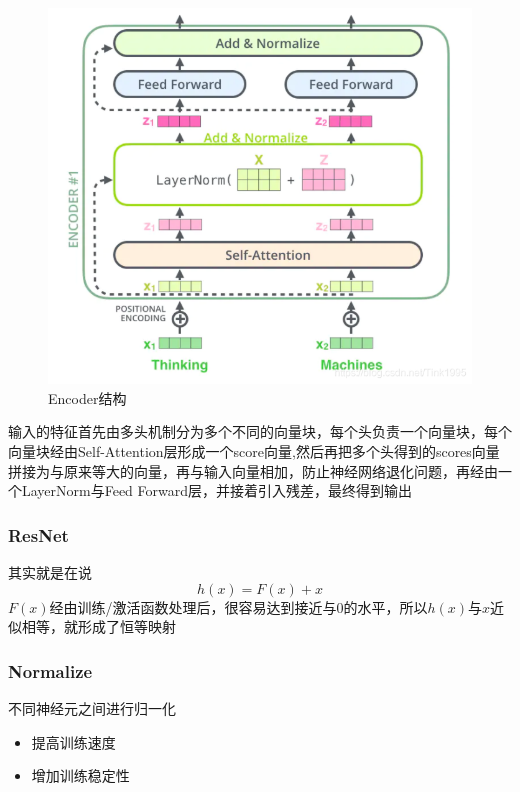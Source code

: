 \documentclass{article}
\begin{document}
\begin{sloppypar}
      \begin{figure}[ht]
            \centering
            \label{enc}
            \includegraphics[scale=0.5]{enc}
            \caption{Encoder结构}
      \end{figure}
      输入的特征首先由多头机制分为多个不同的向量块，每个头负责一个向量块，每个向量块经由Self-Attention层形成一个score向量,然后再把多个头得到的scores向量拼接为与原来等大的向量，再与输入向量相加，防止神经网络退化问题，再经由一个LayerNorm与Feed Forward层，并接着引入残差，最终得到输出


      \subsubsection{ResNet}

      其实就是在说
      $$
            h(x)=F(x)+x
      $$
      $F(x)$经由训练/激活函数处理后，很容易达到接近与0的水平，所以$h(x)$与$x$近似相等，就形成了恒等映射

      \subsubsection{Normalize}

      不同神经元之间进行归一化
      \begin{itemize}
            \item 提高训练速度
            \item 增加训练稳定性
      \end{itemize}



\end{sloppypar}
\end{document}
